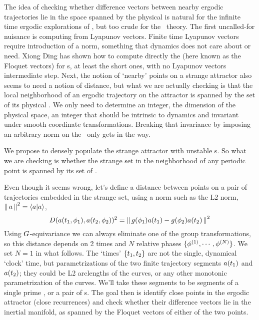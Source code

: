 \begin{description}
The idea of checking whether difference vectors
between nearby ergodic trajectories lie in the space spanned  by the
physical {\cLvs} is natural for the infinite time ergodic explorations
of , but too crude for the \po\ theory. The first
uncalled-for nuisance is computing {\cLvs} from Lyapunov vectors. Finite
time Lyapunov vectors require introduction of a norm, something that
dynamics does not care about or need.
Xiong Ding has shown how to compute directly the {\cLvs} (here known as the Floquet
vectors) for \po s, at least the short ones, with no Lyapunov vectors intermediate
step.
Next,
the notion of `nearby' points on a strange attractor also seems to
need a notion of distance, but what we are actually checking is that
the local neighborhood of an ergodic trajectory on the attractor
is spanned by the set of its physical {\cLvs}. We only need
to determine an integer, the dimension of the physical space, an integer
that should be intrinsic to dynamics and invariant under smooth coordinate
transformations. Breaking that invariance by imposing an arbitrary norm on
the \statesp\ only gets in the way.

We propose to densely populate the strange attractor with unstable \po s.
So what we are checking is
whether the strange set in the neighborhood of any periodic point is
spanned by its set of {\cLvs}.

Even though it seems wrong, let's define a distance between points on
a pair of trajectories embedded in the strange set, using a norm such
as the L2 norm, $\norm{\ssp}^2 = \braket{\ssp}{\ssp}$,
\[
D(a(t_1,{\bf \phi}_1),a(t_2,{\bf \phi}_2))^2=
\left\Arrowvert \, g({\bf \phi}_1)a(t_1)
      -g({\bf \phi}_2)a(t_2) \, \right\Arrowvert^2
\]
Using $G$-equivariance we can always eliminate one of the group
transformations, so this distance depends on 2 times and $N$ relative
phases $\{{\bf \phi}^{(1)},\cdots,{\bf \phi}^{(N)}\}$. We set $N=1$ in what
follows. The `times' $\{t_1,t_2\}$ are not the single, dynamical
`clock' time, but parametrizations of the two finite trajectory segments
$a(t_1)$ and $a(t_2)$; they could be L2 arclengths of the
curves, or any other monotonic parametrization of the curves. We'll take
these segments to be segments of a single prime \po, or a pair of \po s.
The goal then is identify close points in the ergodic attractor (close
recurrences) and check whether their difference vectors lie in the
inertial manifold, as spanned by the Floquet vectors of either of the two points.


\end{description}
